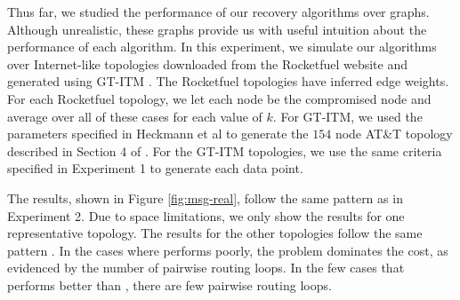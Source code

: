 \begin{figure*}[t]
\centering
{}
\caption{Internet-like graph message overhead}
\label{fig:msg-real}
\end{figure*}

\begin{figure*}[h]
\centering
{}
\caption{Number of epochs/timesteps for real graphs}
\label{fig:epoch-real}
\end{figure*} 





Thus far, we studied the performance of our recovery algorithms over \er graphs. Although unrealistic, these graphs provide us with useful intuition about the performance
of each algorithm. In this experiment, we simulate our algorithms over Internet-like topologies downloaded from the Rocketfuel website \cite{Rocketfuel} and generated using GT-ITM 
\cite{GT-ITM}.  The Rocketfuel topologies have inferred edge weights. For each Rocketfuel topology, we let each node be
the compromised node and average over all of these cases for each value of $k$.  For GT-ITM, we used the parameters specified in Heckmann et al \cite{Heckmann} to generate the $154$ node AT\&T topology
described in Section 4 of \cite{Heckmann}. For the GT-ITM topologies, we use the same criteria specified in Experiment 1 to generate each data point. 

The results, shown in Figure \ref{fig:msg-real}, follow the same pattern as in Experiment 2.  Due to space limitations, we only show the results for one 
representative topology.  The results for the other topologies follow the same pattern \cite{Tech}. In the cases where \second performs poorly,
the \infinity problem dominates the cost, as evidenced by the number of pairwise routing loops. In the few cases that \second performs better than \purges, there 
are few pairwise routing loops.




